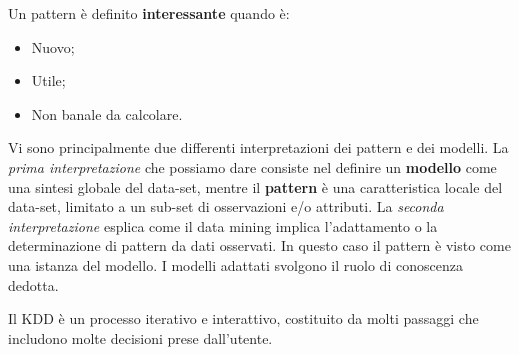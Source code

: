 \documentclass[a4paper]{extarticle}
\begin{document}
Un pattern è definito \textbf{interessante} quando è:
\begin{itemize}
	\item Nuovo;
	\item Utile;
	\item Non banale da calcolare.
\end{itemize}

Vi sono principalmente due differenti interpretazioni dei pattern e dei modelli.
La \textit{prima interpretazione} che possiamo dare consiste nel definire un \textbf{modello} come una sintesi globale del data-set, mentre il \textbf{pattern} è una caratteristica locale del data-set, limitato a un sub-set di osservazioni e/o attributi.
La \textit{seconda interpretazione} esplica come il data mining implica l'adattamento o la determinazione di pattern da dati osservati. In questo caso il pattern è visto come una istanza del modello. I modelli adattati svolgono il ruolo di conoscenza dedotta.

Il KDD è un processo iterativo e interattivo, costituito da molti passaggi che includono molte decisioni prese dall'utente.

\begin{figure}[h]
\noindent
{}%
\end{figure}
\end{document}
